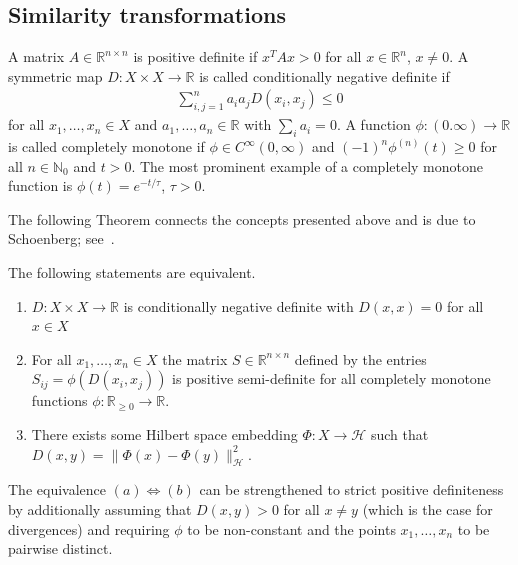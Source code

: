\subsection{Similarity transformations}\label{sec:similarity_transformations}

A matrix $A\in\mathbb{R}^{n\times n}$ is positive definite if $x^TAx>0$ for all $x\in\mathbb{R}^n$, $x\ne0$. A symmetric map $D:X\times X\to\mathbb{R}$ is called conditionally negative definite if
\begin{align*}
    \sum_{i,j=1}^{n}a_ia_jD(x_i,x_j)\le0
\end{align*}
for all $x_1,\dots,x_n\in X$ and $a_1,\dots,a_n\in\mathbb{R}$ with $\sum_{i}a_i=0$. A function $\phi:(0.\infty)\to\mathbb{R}$ is called completely monotone if $\phi\in C^{\infty}(0,\infty)$ and $(-1)^{n}\phi^{(n)}(t)\ge 0$ for all $n\in\mathbb{N}_0$ and $t>0$. The most prominent example of a completely monotone function is $\phi(t)=e^{-t/\tau}$, $\tau>0$.

The following Theorem connects the concepts presented above and is due to Schoenberg; see~\cite{berg_harmonic_1984}.

\begin{Thm}[Schoenberg]\label{thm:schoenberg}
    The following statements are equivalent.
    \begin{enumerate}
        \item[(a)] $D:X\times X\to\mathbb{R}$ is conditionally negative definite with $D(x,x)=0$ for all $x\in X$
        \item[(b)] For all $x_1,\dots,x_n\in X$ the matrix $S\in\mathbb{R}^{n\times n}$ defined by the entries $S_{ij}=\phi(D(x_i,x_j))$ is positive semi-definite for all completely monotone functions $\phi:\mathbb{R}_{\ge0}\to\mathbb{R}$.
        \item[(c)] There exists some Hilbert space embedding $\Phi:X\to\mathcal{H}$ such that $D(x,y)=\|\Phi(x)-\Phi(y)\|_{\mathcal{H}}^{2}$.
    \end{enumerate}
    The equivalence $(a)\iff(b)$ can be strengthened to strict positive definiteness by additionally assuming that $D(x,y)>0$ for all $x\ne y$ (which is the case for divergences) and requiring $\phi$ to be non-constant and the points $x_1,\dots,x_n$ to be pairwise distinct.
\end{Thm}

